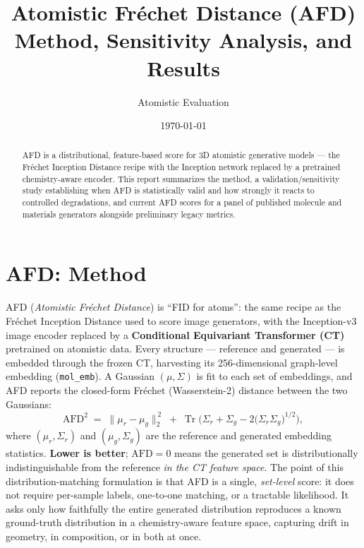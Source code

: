 \documentclass[11pt]{article}
\title{\textbf{Atomistic Fr\'echet Distance (AFD)}\\[0.3em]
\large Method, Sensitivity Analysis, and Results}
\author{Atomistic Evaluation}
\date{\today}
\begin{document}
\maketitle

\begin{abstract}
\noindent
AFD is a distributional, feature-based score for 3D atomistic generative models --- the
Fr\'echet Inception Distance recipe with the Inception network replaced by a pretrained
chemistry-aware encoder. This report summarizes the method, a validation/sensitivity
study establishing when AFD is statistically valid and how strongly it reacts to
controlled degradations, and current AFD scores for a panel of published molecule
and materials generators alongside preliminary legacy metrics.
\end{abstract}

\section{AFD: Method}

AFD (\emph{Atomistic Fr\'echet Distance}) is ``FID for atoms'': the same recipe as the
Fr\'echet Inception Distance used to score image generators, with the Inception-v3 image
encoder replaced by a \textbf{Conditional Equivariant Transformer (CT)} pretrained on
atomistic data. Every structure --- reference and generated --- is embedded through the
frozen CT, harvesting its 256-dimensional graph-level embedding (\texttt{mol\_emb}). A
Gaussian $(\mu,\Sigma)$ is fit to each set of embeddings, and AFD reports the closed-form
Fr\'echet (Wasserstein-2) distance between the two Gaussians:
%
\begin{equation}
\mathrm{AFD}^2 \;=\; \lVert \mu_r - \mu_g \rVert_2^{\,2}
\;+\; \operatorname{Tr}\!\Big( \Sigma_r + \Sigma_g - 2\big(\Sigma_r \Sigma_g\big)^{1/2} \Big),
\end{equation}
%
where $(\mu_r,\Sigma_r)$ and $(\mu_g,\Sigma_g)$ are the reference and generated
embedding statistics. \textbf{Lower is better}; $\mathrm{AFD}=0$ means the generated set
is distributionally indistinguishable from the reference \emph{in the CT feature space}.
The point of this distribution-matching formulation is that AFD is a single,
\emph{set-level} score: it does not require per-sample labels, one-to-one matching, or a
tractable likelihood. It asks only how faithfully the entire generated distribution
reproduces a known ground-truth distribution in a chemistry-aware feature space, capturing
drift in geometry, in composition, or in both at once.
\end{document}
